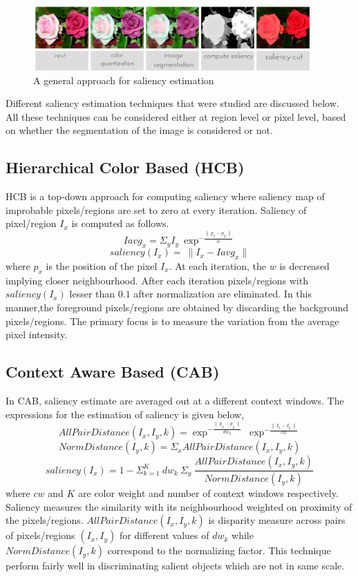 \begin{figure}[htpb]
   \begin{center}
	    \includegraphics[width=0.95\textwidth]{snaps/sal/saliency.eps}     
     \caption {A general approach for saliency estimation}
   \label{fig:salap}
   \end{center}
 \end{figure}

\par Different saliency estimation techniques that were studied are discussed below. All these techniques can be considered either at region level or pixel level, based on whether the segmentation of the image is considered or not.

\subsection{Hierarchical Color Based (HCB)}
HCB is a top-down approach for computing saliency where saliency map of improbable pixels/regions are set to zero at every iteration. Saliency of pixel/region $I_{x}$ is computed as follows. 
$$ Iavg_{x} = \Sigma_{y} I_{y}~\exp^{-\frac{\parallel~p_{x} - p_{y}~\parallel}{w}}  $$
$$ saliency(I_{x}) =~\parallel I_{x} - Iavg_{x} \parallel $$
where $p_{x}$ is the position of the pixel $I_{x}$. At each iteration, the $w$ is decreased implying closer neighbourhood. After each iteration pixels/regions with $ saliency(I_{x})$ lesser than $0.1$ after normalization are eliminated. In this manner,the foreground pixels/regions are obtained by discarding the background pixels/regions. The primary focus is to measure the variation from the average pixel intensity.

\subsection{Context Aware Based (CAB)}
In CAB, saliency estimate are averaged out at a different context windows. The expressions for the estimation of saliency is given below,
$$ AllPairDistance(I_{x},I_{y},k) = \exp^{-\frac{\parallel~p_x - p_y~\parallel}{dw_k}}~\exp^{-\frac{\parallel~I_{x} - I_{y}~\parallel}{cw}}$$
$$ NormDistance(I_{y},k) = \Sigma_{x} AllPairDistance(I_{x},I_{y},k)$$
$$ saliency(I_{x}) = 1- \Sigma^{K}_{k=1}~dw_{k}~\Sigma_{y}~\frac{AllPairDistance(I_{x},I_{y},k)}{NormDistance(I_{y},k)}$$
where $cw$ and $K$ are color weight and number of context windows respectively. Saliency measures the similarity with its neighbourhood weighted on proximity of the pixels/regions. $AllPairDistance(I_{x},I_{y},k)$ is disparity measure across pairs of pixels/regions $(I_{x},I_{y})$ for different values of $dw_{k}$ while $NormDistance(I_{y},k)$ correspond to the normalizing factor.
This technique perform fairly well in discriminating salient objects which are not in same scale.

